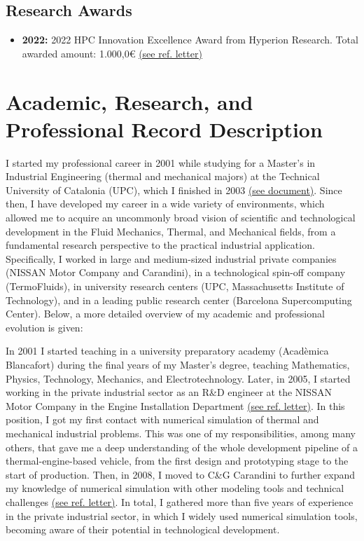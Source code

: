 \documentclass{article}
\begin{document}
\subsection{Research Awards}
\begin{itemize}
\item {\bf 2022:} 2022 HPC Innovation Excellence Award from Hyperion Research. Total awarded amount: 1.000,0€ \hyperlink{hyperion-award.1}{(see ref. letter)} 
\end{itemize}

\newpage
\section{Academic, Research, and Professional Record Description}

I started my professional career in 2001 while studying for a Master's in Industrial Engineering (thermal and mechanical majors) at the Technical University of Catalonia (UPC), which I finished in 2003 \hyperlink{carrera-EI.1}{(see document)}. Since then, I have developed my career in a wide variety of environments, which allowed me to acquire an uncommonly broad vision of scientific and technological development in the Fluid Mechanics, Thermal, and Mechanical fields, from a fundamental research perspective to the practical industrial application. Specifically, I worked in large and medium-sized industrial private companies (NISSAN Motor Company and Carandini), in a technological spin-off company (TermoFluids), in university research centers (UPC, Massachusetts Institute of Technology), and in a leading public research center (Barcelona Supercomputing Center). Below, a more detailed overview of my academic and professional evolution is given:

In 2001 I started teaching in a university preparatory academy (Acadèmica Blancafort) during the final years of my Master's degree, teaching Mathematics, Physics, Technology, Mechanics, and Electrotechnology.
Later, in 2005, I started working in the private industrial sector as an R\&D engineer at the NISSAN Motor Company in the Engine Installation Department \hyperlink{nissan.1}{(see ref. letter)}. In this position, I got my first contact with numerical simulation of thermal and mechanical industrial problems. This was one of my responsibilities, among many others, that gave me a deep understanding of the whole development pipeline of a thermal-engine-based vehicle, from the first design and prototyping stage to the start of production. 
Then, in 2008, I moved to C\&G Carandini to further expand my knowledge of numerical simulation with other modeling tools and technical challenges \hyperlink{carandini.1}{(see ref. letter)}. In total, I gathered more than five years of experience in the private industrial sector, in which I widely used numerical simulation tools, becoming aware of their potential in technological development. 
\end{document}

